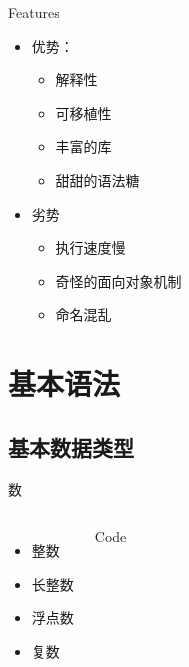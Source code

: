 \documentclass[xcolor=dvipsnames, 9pt]{beamer}
\newenvironment{code}{\begin{semiverbatim} \begin{footnotesize}}{\end{footnotesize}\end{semiverbatim}}
\begin{document}
\begin{frame}{Features}
	\begin{itemize}
		\item<1-> 优势：
			\begin{itemize}
				\item<2-> 解释性
					\vspace{0.1cm}
				\item<3-> 可移植性
					\vspace{0.1cm}
				\item<4-> 丰富的库
					\vspace{0.1cm}
				\item<5-> 甜甜的语法糖
			\end{itemize}
		\vspace{0.4cm}
		\item<6-> 劣势
			\begin{itemize}
				\item<7-> 执行速度慢
					\vspace{0.1cm}
				\item<8-> 奇怪的面向对象机制
					\vspace{0.1cm}
				\item<9-> 命名混乱
			\end{itemize}
	\end{itemize}
\end{frame}

\section{基本语法}
\subsection{基本数据类型}
\begin{frame}[fragile]{数}
	\begin{columns}
	\begin{itemize}
				\item<2-> 整数
					\vspace{0.3cm}
				\item<3-> 长整数
					\vspace{0.3cm}
				\item<5-> 浮点数
					\vspace{0.3cm}
				\item<6-> 复数
	\end{itemize}
	\begin{block}{Code}
		\begin{code}


		\end{code}
	\end{block}
	\end{columns}
\end{frame}
\end{document}
